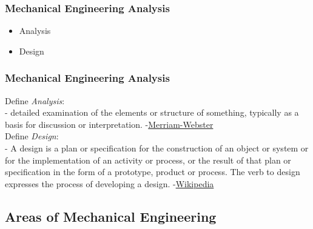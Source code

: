 \documentclass[fleqn]{beamer} %
\newcommand{\sectionIsubsectionItitle}{Mechanical Engineering Analysis}
\newcommand{\sectionIsubsectionIItitle}{Areas of Mechanical Engineering}
\begin{document}
			\begin{frame}
				\frametitle{\sectionIsubsectionItitle}
				\bigskip

			    \begin{itemize}
					\item Analysis \vspace{15mm}
					\item Design
				\end{itemize}  

				\btVFill
			\end{frame}

			\begin{frame}
				\frametitle{\sectionIsubsectionItitle}
				\bigskip

				Define {\it Analysis}: \\	
				- detailed examination of the elements or structure of something, typically as a basis for discussion or interpretation. {\tiny -\href{https://www.merriam-webster.com/dictionary/analysis}{Merriam-Webster}} \vspace{5mm} \\ 

				Define {\it Design}: \\
				- A design is a plan or specification for the construction of an object or system or for the implementation of an activity or process, or the result of that plan or specification in the form of a prototype, product or process. The verb to design expresses the process of developing a design. {\tiny -\href{https://en.wikipedia.org/wiki/Design}{Wikipedia}}\\

				\btVFill
			\end{frame}

		\subsection{\sectionIsubsectionIItitle}\label{sectionIsubsectionII}
\end{document}
